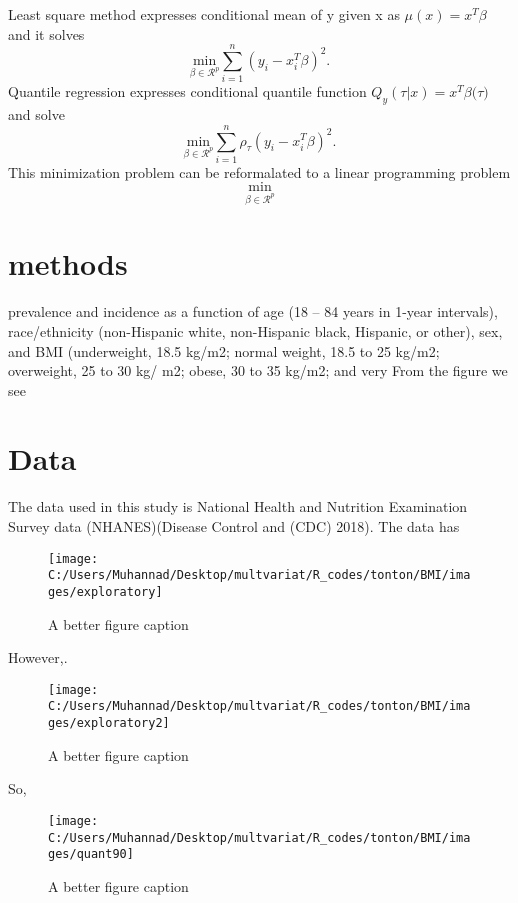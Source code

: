 \documentclass[]{article}
\begin{document}
Least square method expresses conditional mean of y given x as
\(\mu(x)=x^T\beta\) and it solves
\[ \underset{\beta\in \mathcal{R}^p}{\text{min}}\sum_{i=1}^n(y_i- x_i^T\beta)^2.\]
Quantile regression expresses conditional quantile function
\(Q_y(\tau|x)=x^T \beta ({\tau)}\) and solve
\[ \underset{\beta\in \mathcal{R}^p}{\text{min}}\sum_{i=1}^n\rho_{\tau}(y_i- x_i^T\beta)^2.\]This
minimization problem can be reformalated to a linear programming problem
\[ \underset{\beta\in \mathcal{R}^p}{\text{min}} \]

\section{methods}

prevalence and incidence as a function of age (18 -- 84 years in 1-year
intervals), race/ethnicity (non-Hispanic white, non-Hispanic black,
Hispanic, or other), sex, and BMI (underweight, 18.5 kg/m2; normal
weight, 18.5 to 25 kg/m2; overweight, 25 to 30 kg/ m2; obese, 30 to 35
kg/m2; and very From the figure we see

\section{Data}\label{data}

The data used in this study is National Health and Nutrition Examination
Survey data (NHANES)(Disease Control and (CDC) 2018). The data has

\begin{figure}

{\centering \texttt{[image: C:/Users/Muhannad/Desktop/multvariat/R\_codes/tonton/BMI/images/exploratory]} 

}

\caption{A better figure caption}\label{fig:unnamed-chunk-1}
\end{figure}

However,.

\begin{figure}

{\centering \texttt{[image: C:/Users/Muhannad/Desktop/multvariat/R\_codes/tonton/BMI/images/exploratory2]} 

}

\caption{A better figure caption}\label{fig:unnamed-chunk-2}
\end{figure}

So,

\begin{figure}

{\centering \texttt{[image: C:/Users/Muhannad/Desktop/multvariat/R\_codes/tonton/BMI/images/quant90]} 

}

\caption{A better figure caption}\label{fig:unnamed-chunk-3}
\end{figure}
\end{document}
